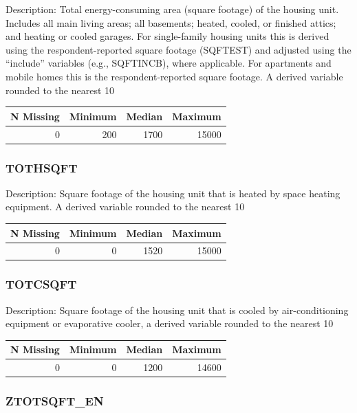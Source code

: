 \documentclass[
]{krantz}
\begin{document}
Description: Total energy-consuming area (square footage) of the housing unit. Includes all main living areas; all basements; heated, cooled, or finished attics; and heating or cooled garages. For single-family housing units this is derived using the respondent-reported square footage (SQFTEST) and adjusted using the ``include'' variables (e.g., SQFTINCB), where applicable. For apartments and mobile homes this is the respondent-reported square footage. A derived variable rounded to the nearest 10

\begin{tabular}[t]{r|r|r|r}
\hline
N Missing & Minimum & Median & Maximum\\
\hline
0 & 200 & 1700 & 15000\\
\hline
\end{tabular}

\hypertarget{tothsqft}{%
\subsubsection*{TOTHSQFT}\label{tothsqft}}


Description: Square footage of the housing unit that is heated by space heating equipment. A derived variable rounded to the nearest 10

\begin{tabular}[t]{r|r|r|r}
\hline
N Missing & Minimum & Median & Maximum\\
\hline
0 & 0 & 1520 & 15000\\
\hline
\end{tabular}

\hypertarget{totcsqft}{%
\subsubsection*{TOTCSQFT}\label{totcsqft}}


Description: Square footage of the housing unit that is cooled by air-conditioning equipment or evaporative cooler, a derived variable rounded to the nearest 10

\begin{tabular}[t]{r|r|r|r}
\hline
N Missing & Minimum & Median & Maximum\\
\hline
0 & 0 & 1200 & 14600\\
\hline
\end{tabular}

\hypertarget{ztotsqft_en}{%
\subsubsection*{ZTOTSQFT\_EN}\label{ztotsqft_en}}
\end{document}
